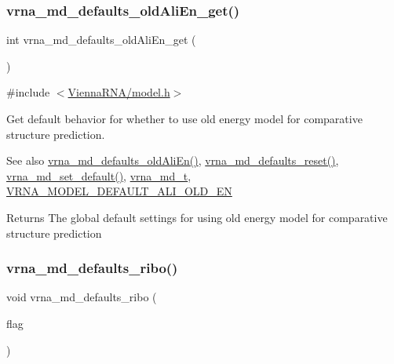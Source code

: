 \subsubsection{\texorpdfstring{vrna\+\_\+md\+\_\+defaults\+\_\+old\+Ali\+En\+\_\+get()}{vrna\_md\_defaults\_oldAliEn\_get()}}
{\footnotesize\ttfamily int vrna\+\_\+md\+\_\+defaults\+\_\+old\+Ali\+En\+\_\+get (\begin{DoxyParamCaption}\item[{void}]{ }\end{DoxyParamCaption})}



{\ttfamily \#include $<$\mbox{\hyperlink{model_8h}{Vienna\+R\+N\+A/model.\+h}}$>$}



Get default behavior for whether to use old energy model for comparative structure prediction. 

\begin{DoxySeeAlso}{See also}
\mbox{\hyperlink{group__model__details_ga41521d5b9fb7e0f31e7ea73f5792afab}{vrna\+\_\+md\+\_\+defaults\+\_\+old\+Ali\+En()}}, \mbox{\hyperlink{group__model__details_ga70834424cf804d149937de89f80ceb45}{vrna\+\_\+md\+\_\+defaults\+\_\+reset()}}, \mbox{\hyperlink{group__model__details_ga8ac6ff84936282436f822644bf841f66}{vrna\+\_\+md\+\_\+set\+\_\+default()}}, \mbox{\hyperlink{group__model__details_ga1f8a10e12a0a1915f2a4eff0b28ea17c}{vrna\+\_\+md\+\_\+t}}, \mbox{\hyperlink{group__model__details_ga2a5bbfc1edf33077e39466d2d9807115}{V\+R\+N\+A\+\_\+\+M\+O\+D\+E\+L\+\_\+\+D\+E\+F\+A\+U\+L\+T\+\_\+\+A\+L\+I\+\_\+\+O\+L\+D\+\_\+\+EN}} 
\end{DoxySeeAlso}
\begin{DoxyReturn}{Returns}
The global default settings for using old energy model for comparative structure prediction 
\end{DoxyReturn}
\mbox{\label{group__model__details_ga937c45e1d06fd6168730a9b08d130be3}} 
\subsubsection{\texorpdfstring{vrna\+\_\+md\+\_\+defaults\+\_\+ribo()}{vrna\_md\_defaults\_ribo()}}
{\footnotesize\ttfamily void vrna\+\_\+md\+\_\+defaults\+\_\+ribo (\begin{DoxyParamCaption}\item[{int}]{flag }\end{DoxyParamCaption})}



